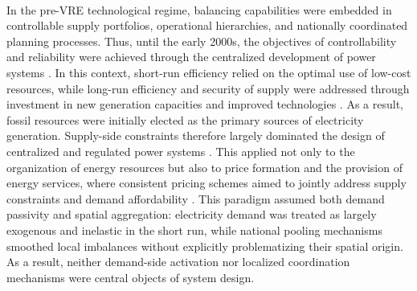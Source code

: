 \documentclass[12pt]{article}
\begin{document}
\paragraph{}
In the pre-VRE technological regime, balancing capabilities were embedded in controllable supply portfolios, operational hierarchies, and nationally coordinated planning processes. Thus, until the early 2000s, the objectives of controllability and reliability were achieved through the centralized development of power  systems \citep{stoft2002power}. In this context, short-run efficiency relied on the optimal use of low-cost resources, while long-run efficiency and security of supply \citep{Chester2010EnergySecurity} were addressed through investment in new generation capacities and improved technologies \citep{creti2019economics}. As a result, fossil resources were initially elected as the primary sources of electricity generation. Supply-side constraints therefore largely dominated the design of centralized and regulated power systems \citep{devine1983shafts,hausman2002market}. This applied not only to the organization of energy resources  \citep{klass2014grid} but also to price formation and the provision of energy services, where consistent pricing schemes
aimed to jointly address supply constraints and demand affordability \citep{boiteux1951tarification}. This paradigm assumed both demand passivity and spatial aggregation: electricity demand was treated as largely exogenous and inelastic in the short run, while national pooling mechanisms smoothed local imbalances without explicitly problematizing their spatial origin. As a result, neither demand-side activation nor localized coordination mechanisms were central objects of system design.
\end{document}

